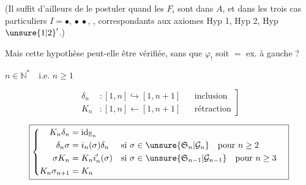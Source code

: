 (Il suffit d'ailleurs de le postuler quand les $F_i$ sont dans $A$, et dans les trois cas particuliers $I=\bullet$, $\bullet\ \bullet$,
\diagram{\begin{tikzcd}[ampersand replacement=\&,column sep=tiny,row sep=tiny]
\bullet\arrow[dr]\&\&\bullet\arrow[dl]\\
\&\bullet\&
\end{tikzcd}}, correspondants aux axiomes Hyp 1, Hyp 2, Hyp $\unsure{1|2}'$.)

Mais cette hypothèse peut-elle être vérifiée, sans que $\varphi_!$ soit $=$ ex. à gauche ?


$n\in\mathbb N^*\quad\text{i.e. }n\geq1$

\[
\left.\begin{aligned}
\delta_n &: [1,n]\hookrightarrow[1,n+1]&&\text{inclusion}\\
K_n &: [1,n]\longleftarrow[1,n+1]&&\text{rétraction}
\end{aligned}\right]
\]

\[
\boxed{\left\{\begin{aligned}
K_n\delta_n&=\mathrm{id}_{\mathbb E_n}\\
\delta_n\sigma&=i_n(\sigma)\delta_n&&\text{si }\sigma\in\unsure{\mathfrak S_n|\mathcal G_n}\quad\text{pour }n\geq2\\
\sigma K_n&=K_n i'_n(\sigma)&&\text{si }\sigma\in\unsure{\mathfrak S_{n-1}|\mathcal G_{n-1}}\quad\text{pour }n\geq3\\
K_n\sigma_{n+1}&=K_n
\end{aligned}\right.}
\]

